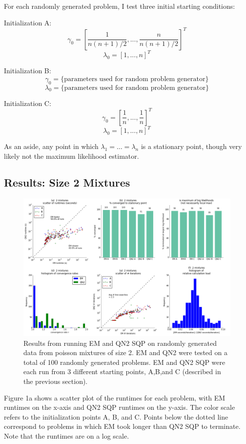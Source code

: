 \documentclass[letter,12pt]{article}
\begin{document}
For each randomly generated problem, I test three initial starting conditions:

Initialization A:
\[
\gamma_0 = [\frac{1}{n(n+1)/2},...,\frac{n}{n(n+1)/2}]^T
\]
\[
\lambda_0 = [1,...,n]^T
\]

Initialization B:
\[
\gamma_0 = \{\text{parameters used for random problem generator}\}
\]
\[
\lambda_0 = \{\text{parameters used for random problem generator}\}
\]

Initialization C:
\[
\gamma_0 = [\frac{1}{n},...,\frac{1}{n}]^T
\]
\[
\lambda_0 = [1,...,n]^T
\]

As an aside, any point in which $\lambda_1 = \dots = \lambda_n$ is a stationary point, though very likely not the maximum likelihood estimator.

\pagebreak
\subsection{Results: Size 2 Mixtures}

\begin{figure}[h]
\centering
\includegraphics[width=16cm]{fig_RunData2_K2_init3.png}
\caption{Results from running EM and QN2 SQP on randomly generated data from poisson mixtures of size 2.  EM and QN2 were tested on a total of 100 randomly generated problems.  EM and QN2 SQP were each run from 3 different starting points, A,B,and C (described in the previous section).}
\end{figure}

Figure 1a shows a scatter plot of the runtimes for each problem, with EM runtimes on the x-axis and QN2 SQP runtimes on the y-axis.  The color scale refers to the initialization points A, B, and C.  Points below the dotted line correspond to problems in which EM took longer than QN2 SQP to terminate.  Note that the runtimes are on a log scale.  
\end{document}
